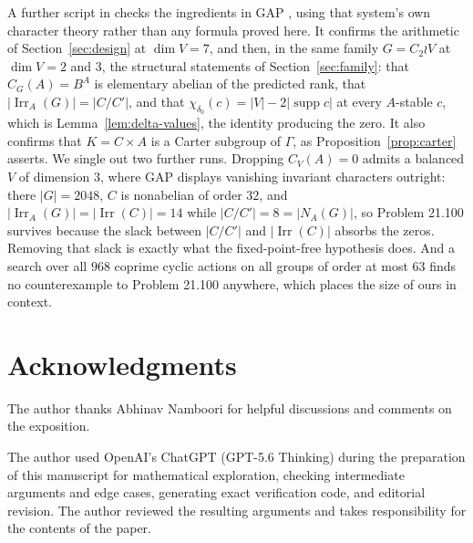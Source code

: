 \documentclass[11pt]{article}
\theoremstyle{definition}
\theoremstyle{remark}
\newcommand{\Irr}{\operatorname{Irr}}
\newcommand{\supp}{\operatorname{supp}}
\begin{document}
A further script in \cite{code} checks the ingredients in GAP \cite{gap}, using that
system's own character theory rather than any formula proved here.  It
confirms the arithmetic of Section~\ref{sec:design} at $\dim V=7$, and
then, in the same family $G=C_2\wr V$ at $\dim V=2$ and $3$, the
structural statements of Section~\ref{sec:family}: that $C_G(A)=B^A$ is
elementary abelian of the predicted rank, that
$|\Irr_A(G)|=|C/C'|$, and that
$\chi_{\delta_0}(c)=|V|-2|\supp c|$ at every $A$-stable $c$, which is
Lemma~\ref{lem:delta-values}, the identity producing the zero.  It also
confirms that $K=C\times A$ is a Carter subgroup of $\Gamma$, as
Proposition~\ref{prop:carter} asserts.  We single out two further runs.
Dropping $C_V(A)=0$ admits a balanced $V$ of dimension $3$, where GAP
displays vanishing invariant characters outright: there $|G|=2048$, $C$
is nonabelian of order $32$, and $|\Irr_A(G)|=|\Irr(C)|=14$ while
$|C/C'|=8=|N_A(G)|$, so Problem 21.100 survives because the slack
between $|C/C'|$ and $|\Irr(C)|$ absorbs the zeros.  Removing that slack
is exactly what the fixed-point-free hypothesis does.  And a search over
all $968$ coprime cyclic actions on all groups of order at most $63$
finds no counterexample to Problem 21.100 anywhere, which places the
size of ours in context.

\section*{Acknowledgments}

The author thanks Abhinav Namboori for helpful discussions and comments on the exposition.

The author used OpenAI's ChatGPT (GPT-5.6 Thinking) during the
preparation of this manuscript for mathematical exploration, checking
intermediate arguments and edge cases, generating exact verification
code, and editorial revision.  The author reviewed the resulting
arguments and takes responsibility for the contents of the paper.
\end{document}
